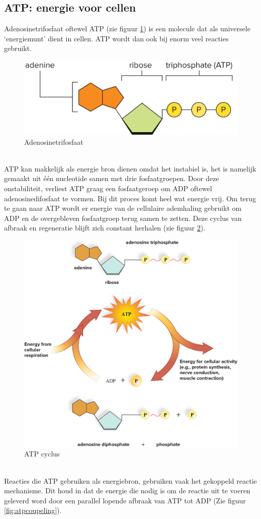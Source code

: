 \documentclass[a4paper,kul]{kulakarticle} %
\begin{document}
\subsection{ATP: energie voor cellen}
Adenosinetrifosfaat oftewel ATP (zie figuur \ref{fig:atp}) is een molecule dat als universele `energiemunt' dient in cellen. ATP wordt dan ook bij enorm veel reacties gebruikt.
\begin{figure}[h]
	\centering
	\includegraphics[width=0.7\linewidth]{ATP}
	\caption[APT]{Adenosinetrifosfaat}
	\label{fig:atp}
\end{figure}\\
ATP kan makkelijk als energie bron dienen omdat het instabiel is, het is namelijk gemaakt uit één nucleotide samen met drie fosfaatgroepen. Door deze onstabiliteit, verliest ATP graag een fosfaatgeroep om ADP oftewel adenosinedifosfaat te vormen. Bij dit proces komt heel wat energie vrij. Om terug te gaan naar ATP wordt er energie van de cellulaire ademhaling gebruikt om ADP en de overgebleven fosfaatgroep terug samen te zetten. Deze cyclus van afbraak en regeneratie blijft zich constant herhalen (zie figuur \ref{fig:atpcycle}).
\begin{figure}[h]
	\centering
	\includegraphics[width=0.65\linewidth]{ATPcycle}
	\caption[ATP cylcus]{ATP cyclus}
	\label{fig:atpcycle}
\end{figure}\\
Reacties die ATP gebruiken als energiebron, gebruiken vaak het gekoppeld reactie mechanisme. Dit houd in dat de energie die nodig is om de reactie uit te voeren geleverd word door een parallel lopende afbraak van ATP tot ADP (Zie figuur \ref{fig:atpcoupeling}). 
\end{document}
